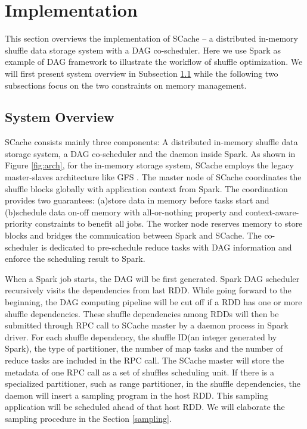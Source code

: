 \section{Implementation}\label{impl}
This section overviews the implementation of SCache -- a distributed in-memory shuffle data storage system with a DAG co-scheduler. Here we use Spark as example of DAG framework to illustrate the workflow of shuffle optimization. We will first present system overview in Subsection \ref{arch} while the following two subsections focus on the two constraints on memory management.

\subsection{System Overview}\label{arch}
SCache consists mainly three components: A distributed in-memory shuffle data storage system, a DAG co-scheduler and the daemon inside Spark. As shown in Figure \ref{fig:arch}, for the in-memory storage system, SCache employs the legacy master-slaves architecture like GFS \cite{gfs}. The master node of SCache coordinates the shuffle blocks globally with application context from Spark. The coordination provides two guarantees: (a)store data in memory before tasks start and (b)schedule data on-off memory with all-or-nothing property and context-aware-priority constraints to benefit all jobs. The worker node reserves memory to store blocks and bridges the commuication between Spark and SCache. The co-scheduler is dedicated to pre-schedule reduce tasks with DAG information and enforce the scheduling result to Spark.

When a Spark job starts, the DAG will be first generated. Spark DAG scheduler recursively visits the dependencies from last RDD. While going forward to the beginning, the DAG computing pipeline will be cut off if a RDD has one or more shuffle dependencies. These shuffle dependencies among RDDs will then be submitted through RPC call to SCache master by a daemon process in Spark driver. For each shuffle dependency, the shuffle ID(an integer generated by Spark), the type of partitioner, the number of map tasks and the number of reduce tasks are included in the RPC call. The SCache master will store the metadata of one RPC call as a set of shuffles scheduling unit. If there is a specialized partitioner, such as range partitioner, in the shuffle dependencies, the daemon will insert a sampling program in the host RDD. This sampling application will be scheduled ahead of that host RDD. We will elaborate the sampling procedure in the Section \ref{sampling}.

